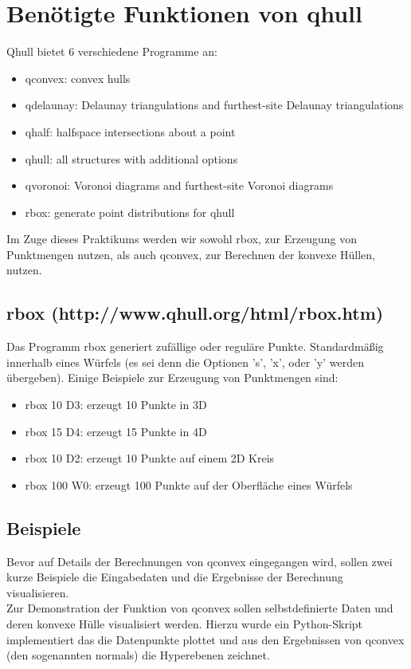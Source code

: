 \documentclass[12pt]{scrartcl}
\begin{document}
\section{Benötigte Funktionen von qhull}

Qhull bietet 6 verschiedene Programme an:
\begin{itemize}
    \setlength\itemsep{0em}
    \item qconvex: convex hulls
    \item qdelaunay: Delaunay triangulations and furthest-site Delaunay triangulations
    \item qhalf: halfspace intersections about a point
    \item qhull: all structures with additional options
    \item qvoronoi: Voronoi diagrams and furthest-site Voronoi diagrams
    \item rbox: generate point distributions for qhull
\end{itemize}

Im Zuge dieses Praktikums werden wir sowohl rbox, zur Erzeugung von Punktmengen nutzen, als auch qconvex, zur Berechnen der konvexe Hüllen, nutzen.



\subsection{rbox (http://www.qhull.org/html/rbox.htm)}
Das Programm rbox generiert zufällige oder reguläre Punkte. Standardmäßig innerhalb eines Würfels (es sei denn die Optionen 's', 'x', oder 'y' werden übergeben).
Einige Beispiele zur Erzeugung von Punktmengen sind:
\begin{itemize}
    \setlength\itemsep{0em}
    \item rbox 10 D3: erzeugt 10 Punkte in 3D
    \item rbox 15 D4: erzeugt 15 Punkte in 4D
    \item rbox 10 D2: erzeugt 10 Punkte auf einem 2D Kreis
    \item rbox 100 W0: erzeugt 100 Punkte  auf der Oberfläche eines Würfels
\end{itemize}

\subsection{Beispiele}
Bevor auf Details der Berechnungen von qconvex eingegangen wird, sollen zwei kurze Beispiele die Eingabedaten und die Ergebnisse der Berechnung visualisieren.\\
Zur Demonstration der Funktion von qconvex sollen selbstdefinierte Daten und deren konvexe Hülle visualisiert werden. Hierzu wurde ein Python-Skript implementiert das die Datenpunkte plottet und aus den Ergebnissen von qconvex (den sogenannten normals) die Hyperebenen zeichnet. 
\end{document}
